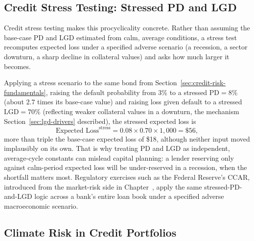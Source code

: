 \documentclass[../ai_in_finance]{subfiles}
\begin{document}
\subsection{Credit Stress Testing: Stressed PD and LGD}
\label{sec:credit-stress-testing}

Credit stress testing makes this procyclicality concrete. Rather than assuming the base-case PD and LGD estimated from calm, average conditions, a stress test recomputes expected loss under a specified adverse scenario (a recession, a sector downturn, a sharp decline in collateral values) and asks how much larger it becomes.

Applying a stress scenario to the same bond from Section~\ref{sec:credit-risk-fundamentals}, raising the default probability from $3\%$ to a stressed $\text{PD}=8\%$ (about $2.7$ times its base-case value) and raising loss given default to a stressed $\text{LGD}=70\%$ (reflecting weaker collateral values in a downturn, the mechanism Section~\ref{sec:lgd-drivers} described), the stressed expected loss is
\begin{equation*}
\text{Expected Loss}^{\text{stress}} = 0.08 \times 0.70 \times 1{,}000 = \$56,
\end{equation*}
more than triple the base-case expected loss of \$18, although neither input moved implausibly on its own. That is why treating PD and LGD as independent, average-cycle constants can mislead capital planning: a lender reserving only against calm-period expected loss will be under-reserved in a recession, when the shortfall matters most.
Regulatory exercises such as the Federal Reserve's CCAR, introduced from the market-risk side in Chapter~, apply the same stressed-PD-and-LGD logic across a bank's entire loan book under a specified adverse macroeconomic scenario.

\subsection{Climate Risk in Credit Portfolios}
\label{sec:climate-credit}
\end{document}
